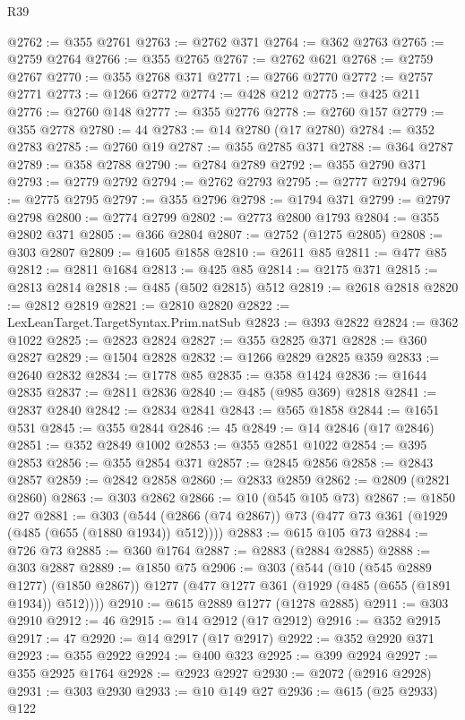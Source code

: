 \begin{lexlean}{R39}
\begin{coremodule}
@2762 := @355 @2761
@2763 := @2762 @371
@2764 := @362 @2763
@2765 := @2759 @2764
@2766 := @355 @2765
@2767 := @2762 @621
@2768 := @2759 @2767
@2770 := @355 @2768 @371
@2771 := @2766 @2770
@2772 := @2757 @2771
@2773 := @1266 @2772
@2774 := @428 @212
@2775 := @425 @211
@2776 := @2760 @148
@2777 := @355 @2776
@2778 := @2760 @157
@2779 := @355 @2778
@2780 := 44
@2783 := @14 @2780 (@17 @2780)
@2784 := @352 @2783
@2785 := @2760 @19
@2787 := @355 @2785 @371
@2788 := @364 @2787
@2789 := @358 @2788
@2790 := @2784 @2789
@2792 := @355 @2790 @371
@2793 := @2779 @2792
@2794 := @2762 @2793
@2795 := @2777 @2794
@2796 := @2775 @2795
@2797 := @355 @2796
@2798 := @1794 @371
@2799 := @2797 @2798
@2800 := @2774 @2799
@2802 := @2773 @2800 @1793
@2804 := @355 @2802 @371
@2805 := @366 @2804
@2807 := @2752 (@1275 @2805)
@2808 := @303 @2807
@2809 := @1605 @1858
@2810 := @2611 @85
@2811 := @477 @85
@2812 := @2811 @1684
@2813 := @425 @85
@2814 := @2175 @371
@2815 := @2813 @2814
@2818 := @485 (@502 @2815) @512
@2819 := @2618 @2818
@2820 := @2812 @2819
@2821 := @2810 @2820
@2822 := LexLeanTarget.TargetSyntax.Prim.natSub
@2823 := @393 @2822
@2824 := @362 @1022
@2825 := @2823 @2824
@2827 := @355 @2825 @371
@2828 := @360 @2827
@2829 := @1504 @2828
@2832 := @1266 @2829 @2825 @359
@2833 := @2640 @2832
@2834 := @1778 @85
@2835 := @358 @1424
@2836 := @1644 @2835
@2837 := @2811 @2836
@2840 := @485 (@985 @369) @2818
@2841 := @2837 @2840
@2842 := @2834 @2841
@2843 := @565 @1858
@2844 := @1651 @531
@2845 := @355 @2844
@2846 := 45
@2849 := @14 @2846 (@17 @2846)
@2851 := @352 @2849 @1002
@2853 := @355 @2851 @1022
@2854 := @395 @2853
@2856 := @355 @2854 @371
@2857 := @2845 @2856
@2858 := @2843 @2857
@2859 := @2842 @2858
@2860 := @2833 @2859
@2862 := @2809 (@2821 @2860)
@2863 := @303 @2862
@2866 := @10 (@545 @105 @73)
@2867 := @1850 @27
@2881 := @303
    (@544 (@2866 (@74 @2867)) @73 (@477 @73 @361 (@1929 (@485 (@655 (@1880 @1934)) @512))))
@2883 := @615 @105 @73
@2884 := @726 @73
@2885 := @360 @1764
@2887 := @2883 (@2884 @2885)
@2888 := @303 @2887
@2889 := @1850 @75
@2906 := @303
    (@544
      (@10 (@545 @2889 @1277) (@1850 @2867))
      @1277
      (@477 @1277 @361 (@1929 (@485 (@655 (@1891 @1934)) @512))))
@2910 := @615 @2889 @1277 (@1278 @2885)
@2911 := @303 @2910
@2912 := 46
@2915 := @14 @2912 (@17 @2912)
@2916 := @352 @2915
@2917 := 47
@2920 := @14 @2917 (@17 @2917)
@2922 := @352 @2920 @371
@2923 := @355 @2922
@2924 := @400 @323
@2925 := @399 @2924
@2927 := @355 @2925 @1764
@2928 := @2923 @2927
@2930 := @2072 (@2916 @2928)
@2931 := @303 @2930
@2933 := @10 @149 @27
@2936 := @615 (@25 @2933) @122

\end{coremodule}
\end{lexlean}
